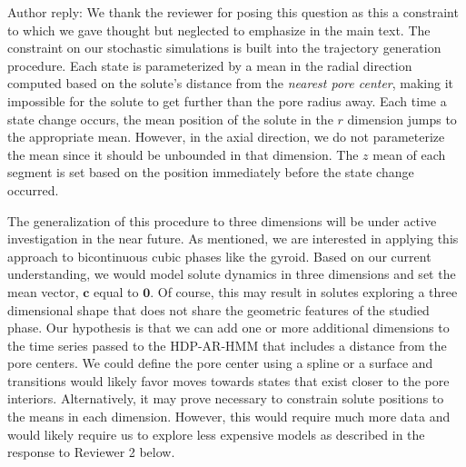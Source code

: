 \documentclass{article}
\begin{document}
\begin{enumerate}[label={Comment \theenumi :}, leftmargin=3.9\parindent]
    Author reply: We thank the reviewer for posing this question as this a constraint to which 
    we gave thought but neglected to emphasize in the main text. 
    The constraint on our stochastic simulations is built into the trajectory generation procedure.
    Each state is parameterized by a mean in the radial direction computed based on the solute's 
    distance from the \textit{nearest pore center}, making it impossible for the solute to get 
    further than the pore radius away. Each time a state change occurs, the mean position of the
    solute in the $r$ dimension jumps to the appropriate mean. However, in the axial direction, 
    we do not parameterize the mean since it should be unbounded in that dimension. The $z$ mean
    of each segment is set based on the position immediately before the state change occurred.
    
    The generalization of this procedure to three dimensions will be under active investigation 
    in the near future. As mentioned, we are interested in applying this approach to bicontinuous
    cubic phases like the gyroid. Based on our current understanding, we would model solute dynamics
    in three dimensions and set the mean vector, $\mathbf{c}$ equal to $\mathbf{0}$. Of course, this
    may result in solutes exploring a three dimensional shape that does not share the geometric 
    features of the studied phase. Our hypothesis is that we can add one or more additional 
    dimensions to the time series passed to the HDP-AR-HMM that includes a distance from the pore centers. 
    We could define the pore center using a spline or a surface and transitions would likely
    favor moves towards states that exist closer to the pore interiors. Alternatively, it may prove
    necessary to constrain solute positions to the means in each dimension. However, this would require 
    much more data and would likely require us to explore less expensive models as described in
    the response to Reviewer 2 below.
    

\end{enumerate}
\end{document}

